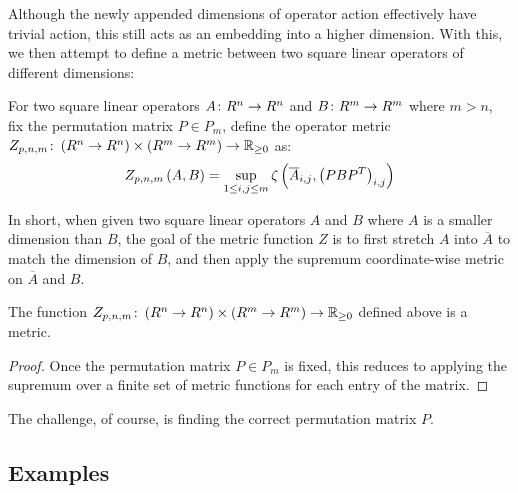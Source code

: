 \documentclass[12pt]{article}
\begin{document}
Although the newly appended dimensions of operator action
effectively have trivial action, this still acts as an embedding into
a higher dimension.
With this, we then attempt to define a metric between
two square linear operators of different dimensions:
\begin{definition}
  For two square linear operators
  \(A \colon R^n \to R^n\) and \(B \colon R^m \to R^m\) where \(m > n\),
  fix the permutation matrix \(P \in P_m\),
  define the operator metric
  \(Z_{p, n, m} \colon \left(R^n \to R^n\right) \times \left(R^m \to R^m\right) \to \mathbb{R}_{\geq 0}\) as:
  \begin{align*}
    Z_{p, n, m}\left(A, B\right) =
      \sup_{1 \leq i, j \leq m}
        \zeta\left(\overline{A}_{i, j}, \left(PB{P}^{T}\right)_{i, j}\right)
  \end{align*}
\end{definition}
In short, when given two square linear operators
\(A\) and \(B\) where \(A\)
is a smaller dimension than \(B\), the goal of the metric function \(Z\)
is to first stretch \(A\) into \(\overline{A}\)
to match the dimension of \(B\),
and then apply the supremum coordinate-wise metric
on \(\overline{A}\) and \(B\).

\begin{theorem}
  The function
  \(Z_{p, n, m} \colon \left(R^n \to R^n\right) \times \left(R^m \to R^m\right) \to \mathbb{R}_{\geq 0}\) 
  defined above is a metric.
\end{theorem}
\begin{proof}
  Once the permutation matrix \(P \in P_m\) is fixed, this reduces to
  applying the supremum over a finite set of metric functions
  for each entry of the matrix.
\end{proof}

The challenge, of course, is finding the correct permutation matrix \(P\).


\subsection{Examples}
\end{document}
